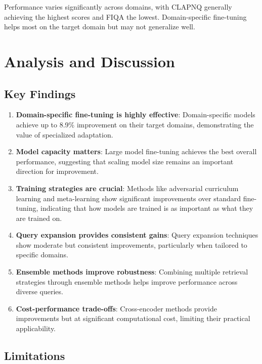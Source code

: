 \documentclass[11pt]{article}
\begin{document}
Performance varies significantly across domains, with CLAPNQ generally achieving the highest scores and FIQA the lowest. Domain-specific fine-tuning helps most on the target domain but may not generalize well.

\section{Analysis and Discussion}

\subsection{Key Findings}

\begin{enumerate}
    \item \textbf{Domain-specific fine-tuning is highly effective}: Domain-specific models achieve up to 8.9\% improvement on their target domains, demonstrating the value of specialized adaptation.
    
    \item \textbf{Model capacity matters}: Large model fine-tuning achieves the best overall performance, suggesting that scaling model size remains an important direction for improvement.
    
    \item \textbf{Training strategies are crucial}: Methods like adversarial curriculum learning and meta-learning show significant improvements over standard fine-tuning, indicating that how models are trained is as important as what they are trained on.
    
    \item \textbf{Query expansion provides consistent gains}: Query expansion techniques show moderate but consistent improvements, particularly when tailored to specific domains.
    
    \item \textbf{Ensemble methods improve robustness}: Combining multiple retrieval strategies through ensemble methods helps improve performance across diverse queries.
    
    \item \textbf{Cost-performance trade-offs}: Cross-encoder methods provide improvements but at significant computational cost, limiting their practical applicability.
\end{enumerate}

\subsection{Limitations}
\end{document}
